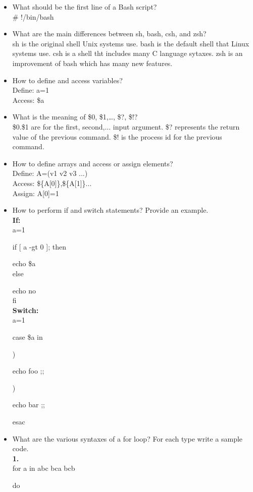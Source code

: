\documentclass{article}
\begin{document}
\begin{itemize}
\item What should be the first line of a Bash script?\\
\# !/bin/bash
\item What are the main differences between sh, bash, csh, and zsh?\\
sh is the original shell Unix systems use. bash is the default shell that Linux systems use. csh is a shell tht includes many C language sytaxes. zsh is an improvement of bash which has many new features. 
\item How to define and access variables?\\
Define: a=1\\
Access: \$a
\item What is the meaning of \$0, \$1,…, \$?, \$!?\\
\$0.\$1 are for the first, second,... input argument. \$? represents the return value of the previous command. \$! is the process id for the previous command.
\item How to define arrays and access or assign elements?\\
Define: A=(v1 v2 v3 ...)\\
Access: \$\{A[0]\},\$\{A[1]\}...\\
Assign: A[0]=1
\item How to perform if and switch statements? Provide an example.\\
{\bf If:} \\
a=1

if [ a -gt 0 ]; then

    \qquad echo \$a\\
else

    \qquad echo no\\
fi\\

{\bf Switch:}  \\
a=1

case \$a in

 )

\qquad \qquad echo foo ;;

 )

\qquad \qquad echo bar ;;

esac
\item What are the various syntaxes of a for loop? For each type write a sample code.\\
{\bf 1. }\\
for a in abc bca bcb 

do 


\end{itemize}
\end{document}
